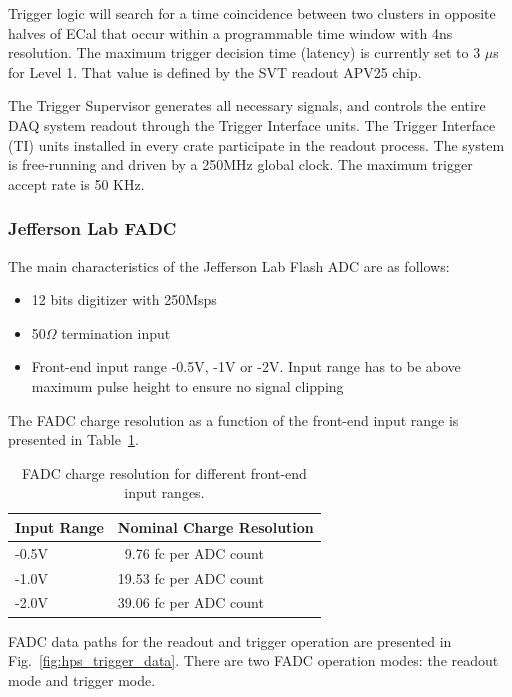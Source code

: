  Trigger logic will search for a time coincidence between two clusters in opposite halves of ECal that occur within a programmable time window with 4ns resolution. The maximum trigger decision time (latency) is currently set to 3 $\mu$s for Level 1. That value is defined by the SVT readout APV25 chip.

The Trigger Supervisor generates all necessary signals, and controls the entire DAQ system readout through the Trigger Interface units. The Trigger Interface (TI) units installed in every crate participate in the readout process. The system is free-running and driven by a 250MHz global clock. The maximum trigger accept rate is 50 KHz.


\subsubsection{Jefferson Lab FADC}

The main characteristics of the Jefferson Lab Flash ADC are as follows:
\begin{itemize}
\item 12 bits digitizer with 250Msps
\item 50$\Omega$ termination input
\item Front-end input range  -0.5V, -1V or -2V.  Input range has to be above maximum pulse height to ensure no signal clipping
\end{itemize}

The FADC charge resolution as a function of the front-end input range is presented in Table~\ref{tab:charge_resolution}.
\begin{table}[h]
\centering
\begin{tabular}{| l | l |}
\hline
Input Range & Nominal Charge Resolution\\\hline
-0.5V & \ 9.76 fc per ADC count \\\hline
-1.0V & 19.53 fc per ADC count \\\hline
-2.0V & 39.06 fc per ADC count \\\hline
\end{tabular}
\caption{FADC charge resolution for different front-end input ranges.}
\label{tab:charge_resolution}
\end{table}

FADC data paths for the readout and trigger operation  are presented in Fig.~\ref{fig:hps_trigger_data}.
There are two FADC operation modes: the readout mode and trigger mode.

